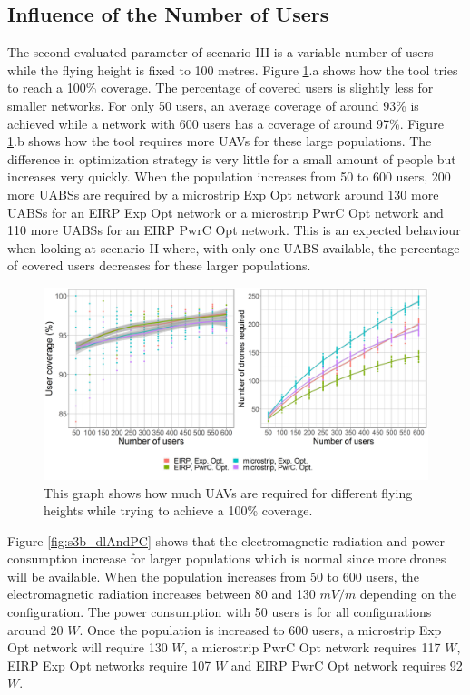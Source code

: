 \subsection{Influence of the Number of Users}
\label{S3B}
The second evaluated parameter of scenario III is a variable number of users while the flying height is fixed to 100 metres.  
Figure \ref{fig:s3b_numdronesAndCov}.a shows how the tool tries to reach a 100\% coverage. The percentage
of covered users is slightly less for smaller networks. For only 50 users, an average 
coverage of around 93\% is achieved while a network with 600 users has a coverage of around 97\%.
Figure \ref{fig:s3b_numdronesAndCov}.b shows how the tool requires more \gls{UAV}s for these large 
populations. 
The difference in optimization strategy is very little for a small amount of people but increases very quickly. 
When the population increases from 50 to 600 users,
 200 more \gls{UABS}s are required by a microstrip \gls{Exp Opt} network 
 around 130 more \gls{UABS}s for an \gls{EIRP} \gls{Exp Opt} network or a microstrip \gls{PwrC Opt} network
 and 110 more \gls{UABS}s for an \gls{EIRP} \gls{PwrC Opt} network.
This is an expected behaviour  when looking at scenario II where, with only one \gls{UABS} available, 
the percentage of covered users decreases for these larger populations.
\clearpage
\begin{figure}[h]
  \includegraphics[width=\textwidth]{../results/s3/uvsnumdronesAndCov.png}
  \caption{This graph shows how much \acs{UAV}s are required for different flying heights while trying to achieve a 100\% coverage.}
  \label{fig:s3b_numdronesAndCov}
\end{figure}

Figure \ref{fig:s3b_dlAndPC} shows that the electromagnetic radiation and power consumption increase for larger 
populations which is normal since more drones will be available.
When the population increases from 50 to 600 users, the electromagnetic radiation increases 
between 80 and 130 $mV/m$ depending on the configuration. The power consumption with 50 users is for all configurations around 
20 $W$. Once the population is increased to 600 users, a microstrip \gls{Exp Opt} network will require 130 $W$, 
 a microstrip \gls{PwrC Opt} network requires 117 $W$,
\gls{EIRP} \gls{Exp Opt} networks require 107 $W$ and \gls{EIRP} \gls{PwrC Opt} network requires 92 $W$.

